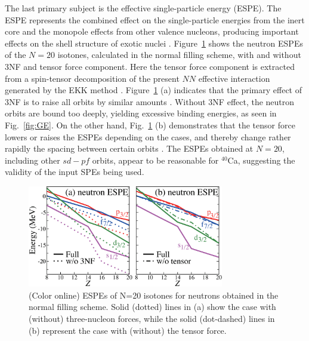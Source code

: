 \documentclass[aps,prl,twocolumn,groupedaddress,showkeys,showpacs,floatfix,superscriptaddress]{revtex4-1}
\newcommand\+{^\dagger}
\begin{document}
The last primary subject is the effective single-particle energy (ESPE). The ESPE represents
the combined effect on the single-particle energies from the inert core and the monopole effects 
from other valence nucleons, 
producing important effects on the shell structure of exotic nuclei 
\cite{PhysRevLett.95.232502,Otsuka:2009qs,PhysRevLett.105.032501,nobel_otsuka}.   
Figure~\ref{fig:ESPE} shows the neutron ESPEs of the
$N=20$ isotones, calculated in the normal filling scheme, with and
without  3NF and tensor force component.
Here the tensor force component is extracted from a spin-tensor decomposition
of the present $NN$ effective interaction generated by the EKK method \cite{Tsunoda:2014hj}.
Figure~\ref{fig:ESPE} (a) indicates that the primary effect of 3NF is to raise all orbits by 
similar amounts \cite{PhysRevLett.105.032501}.  
Without 3NF effect, the neutron orbits are bound too deeply, yielding excessive binding energies,  
as seen in Fig.~\ref{fig:GE}.
On the other hand, 
Fig.~\ref{fig:ESPE} (b) demonstrates that the tensor force lowers or raises the ESPEs depending 
on the cases, and thereby 
change rather rapidly the spacing between certain orbits \cite{PhysRevLett.95.232502}.   
The ESPEs obtained at $N=20$, including other $sd-pf$ orbits, appear to be reasonable for $^{40}$Ca, 
suggesting the validity of the input SPEs being used. 
 
 \begin{figure}[tbp]
  \includegraphics[width=8.5725cm,angle=0,clip]{Fig4.eps}
 \caption{(Color online) ESPEs of N=20 isotones for neutrons
  obtained in the normal filling scheme.
 Solid (dotted) lines in (a) show the case with (without) three-nucleon forces, while  the  
 solid (dot-dashed) lines in (b) represent the case with (without) the tensor force.}
 \label{fig:ESPE}
 \end{figure}
\end{document}
